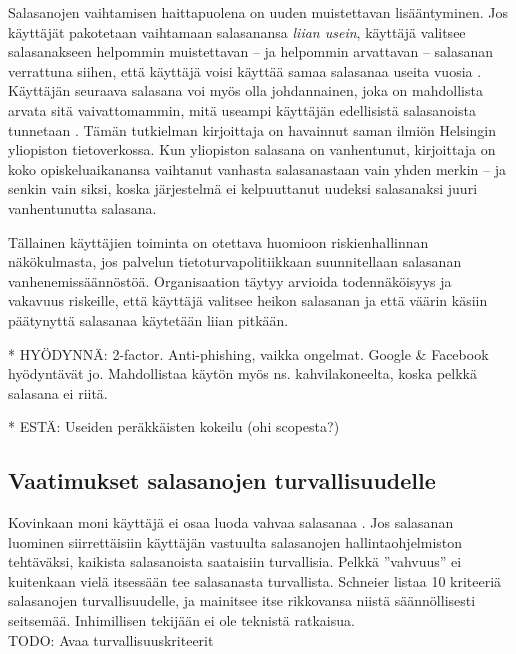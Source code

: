 \documentclass[english,gradu]{tktltiki}
\begin{document}
Salasanojen vaihtamisen haittapuolena on uuden muistettavan lisääntyminen. Jos käyttäjät pakotetaan vaihtamaan salasanansa \emph{liian usein}, käyttäjä valitsee salasanakseen helpommin muistettavan -- ja helpommin arvattavan -- salasanan verrattuna siihen, että käyttäjä voisi käyttää samaa salasanaa useita vuosia \cite{schneier_changing_passwords_10}. Käyttäjän seuraava salasana voi myös olla johdannainen, joka on mahdollista arvata sitä vaivattomammin, mitä useampi käyttäjän edellisistä salasanoista tunnetaan \cite{password_expiration_10}. Tämän tutkielman kirjoittaja on havainnut saman ilmiön Helsingin yliopiston tietoverkossa. Kun yliopiston salasana on vanhentunut, kirjoittaja on koko opiskeluaikanansa vaihtanut vanhasta salasanastaan vain yhden merkin -- ja senkin vain siksi, koska järjestelmä ei kelpuuttanut uudeksi salasanaksi juuri vanhentunutta salasana.

Tällainen käyttäjien toiminta on otettava huomioon riskienhallinnan näkökulmasta, jos palvelun tietoturvapolitiikkaan suunnitellaan salasanan vanhenemissäännöstöä. Organisaation täytyy arvioida todennäköisyys ja vakavuus riskeille, että käyttäjä valitsee heikon salasanan ja että väärin käsiin päätynyttä salasanaa käytetään liian pitkään.

* HYÖDYNNÄ: 2-factor. Anti-phishing, vaikka ongelmat. Google \& Facebook hyödyntävät jo. Mahdollistaa käytön myös ns. kahvilakoneelta, koska pelkkä salasana ei riitä.

* ESTÄ: Useiden peräkkäisten kokeilu (ohi scopesta?)



\subsection{Vaatimukset salasanojen turvallisuudelle} %
\label{sub:vaatimukset_salasanojen_turvallisuudelle}


         Kovinkaan moni käyttäjä ei osaa luoda vahvaa salasanaa \cite{generating_and_remembering_pws_04, password_management_strategies_06}. Jos salasanan luominen siirrettäisiin käyttäjän vastuulta salasanojen hallintaohjelmiston tehtäväksi, kaikista salasanoista saataisiin turvallisia. Pelkkä ''vahvuus'' ei kuitenkaan vielä itsessään tee salasanasta turvallista.
         Schneier \cite{schneier_password_advice_09} listaa 10 kriteeriä salasanojen turvallisuudelle, ja mainitsee itse rikkovansa niistä säännöllisesti seitsemää. Inhimillisen tekijään ei ole teknistä ratkaisua.
         \\
         TODO: Avaa turvallisuuskriteerit
\end{document}
